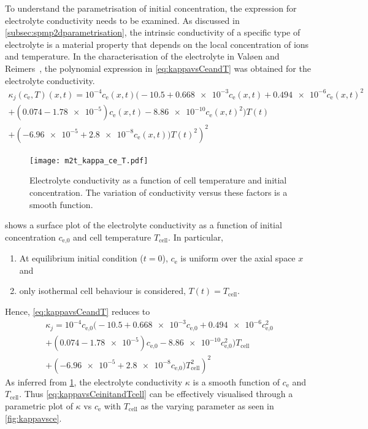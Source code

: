 To  understand  the parametrisation  of  initial  concentration, the  expression
for   electrolyte   conductivity   needs    to   be   examined.   As   discussed
in \cref{subsec:spmp2dparametrisation}, the intrinsic conductivity of a specific
type  of  electrolyte  is  a  material   property  that  depends  on  the  local
concentration of  ions and  temperature. In the characterisation of the
electrolyte in Valøen and  Reimers~\cite{Valoen2005}, the polynomial expression
in \cref{eq:kappavsCeandT} was obtained for the electrolyte conductivity.
\begin{multline}\label{eq:kappavsCeandT}
    \kappa_j(c_\text{e},T)(x,t) =  10^{-4} c_\text{e}(x,t) \bigl(-10.5 + \num{0.668e-3} c_\text{e}(x,t) + \num{0.494e-6}  c_\text{e}{(x,t)}^2\\
    + (0.074 - \num{1.78e-5}) c_\text{e}(x,t) - \num{8.86e-10} c_\text{e}{(x,t)}^2 \bigr)T(t)\\
	+ \left(\num{-6.96e-5} + \num{2.8e-8} c_\text{e}{(x,t)})T(t)^2\right)^2
\end{multline}

\begin{figure}[!htbp]
    \centering
    \texttt{[image: m2t\_kappa\_ce\_T.pdf]}
    \caption[Surface plot of electrolyte conductivity]
    {Electrolyte conductivity as a function of cell temperature and initial
        concentration. The variation of conductivity versus these factors is a
    smooth function.}
    \label{fig:kappavsCeandT}
\end{figure}

 shows  a surface  plot of the  electrolyte conductivity
as  a function  of  initial concentration  $c_\text{e,0}$  and cell  temperature
$T_\text{cell}$. In particular,
\begin{enumerate}%
    \item At  equilibrium  initial condition ($t=0$), $c_\text{e}$ is uniform over the axial space $x$ and
    \item only isothermal cell behaviour is considered, \ie{} $T(t) = T_\text{cell}$.
\end{enumerate}
Hence, \cref{eq:kappavsCeandT} reduces to
\begin{multline}\label{eq:kappavsCeinitandTcell}
    \kappa_j =  10^{-4} c_\text{e,0} \bigl(-10.5 + \num{0.668e-3} c_\text{e,0} + \num{0.494e-6}  c_\text{e,0}^2\\
        + (0.074 - \num{1.78e-5}) c_\text{e,0} - \num{8.86e-10}
    c_\text{e,0}^2 \bigr)T_\text{cell}\\
	+ \left(\num{-6.96e-5} + \num{2.8e-8} c_\text{e,0})T_\text{cell}^2\right)^2
\end{multline}
As   inferred   from \cref{fig:kappavsCeandT},  the   electrolyte   conductivity
$\kappa$   is   a  smooth   function   of   $c_\text{e}$  and   $T_\text{cell}$.
Thus \cref{eq:kappavsCeinitandTcell}  can be  effectively  visualised through  a
parametric plot of $\kappa$ vs  $c_\text{e}$ with $T_\text{cell}$ as the varying
parameter as seen in \cref{fig:kappavsce}.

